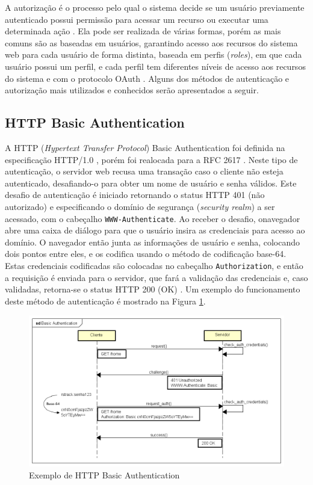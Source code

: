 \documentclass[12pt]{article}
\begin{document}
A autorização é o processo pelo qual o sistema decide se um usuário previamente autenticado
possui permissão para acessar um recurso ou executar uma determinada ação \cite{SPILCA2020}. Ela 
pode ser realizada de várias formas, porém as mais comuns são as baseadas em usuários, garantindo 
acesso aos recursos do sistema web para cada usuário de forma distinta, baseada em perfis 
(\emph{roles}), em que cada usuário possui um perfil, e cada perfil tem diferentes níveis de acesso 
aos recursos do sistema e com o protocolo OAuth \cite{CHAPMAN2012}. Alguns dos métodos de 
autenticação e autorização mais utilizados e conhecidos serão apresentados a seguir.


\subsection{HTTP Basic Authentication}

A HTTP (\emph{Hypertext Transfer Protocol}) Basic Authentication foi definida na especificação
HTTP/1.0 \cite{RFC1945}, porém foi realocada para a RFC 2617 \cite{RFC2617}. Neste tipo de
autenticação, o servidor web recusa uma transação caso o cliente não esteja autenticado,
desafiando-o para obter um nome de usuário e senha válidos. Este desafio de autenticação é iniciado
retornando o status HTTP 401 (não autorizado) e especificando o domínio de segurança
(\emph{security realm}) a ser acessado, com o cabeçalho \texttt{WWW-Authenticate}. Ao receber o 
desafio, onavegador abre uma caixa de diálogo para que o usuário insira as credenciais para acesso 
ao domínio. O navegador então junta as informações de usuário e senha, colocando dois pontos entre 
eles, e os codifica usando o método de codificação base-64. Estas credenciais codificadas são 
colocadas no cabeçalho \texttt{Authorization}, e então a requisição é enviada para o servidor, que 
fará a validação das credenciais e, caso validadas, retorna-se o status HTTP 200 (OK) 
\cite{GOURLEY2002}. Um exemplo do funcionamento deste método de autenticação é mostrado na Figura 
\ref{fig:basicAuth}.

\begin{figure}[ht]
  \centering
  \includegraphics[width=1\textwidth]{Basic Authentication.png}
  \caption{Exemplo de HTTP Basic Authentication}
  \label{fig:basicAuth}
\end{figure}
\end{document}
